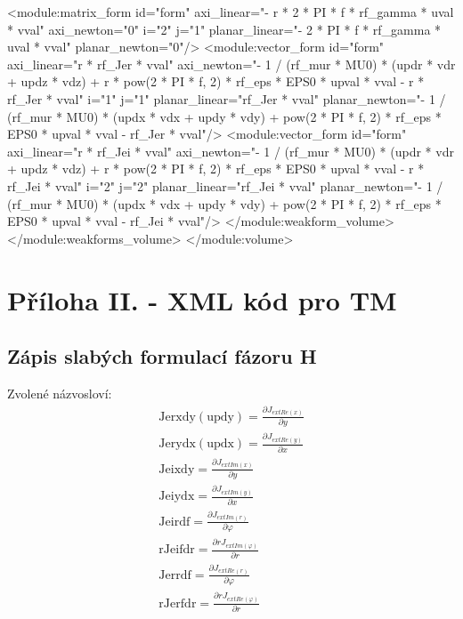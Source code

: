 \documentclass[12pt,a4paper,oneside]{article}
\numberwithin{equation}{section} %
\numberwithin{figure}{section} %
\numberwithin{table}{section} %
\begin{document}
\begin{spverbatim}
        <module:matrix_form id="form" axi_linear="- r * 2 * PI * f * rf_gamma * uval * vval" axi_newton="0" i="2" j="1" planar_linear="- 2 * PI * f * rf_gamma * uval * vval" planar_newton="0"/>
        <module:vector_form id="form" axi_linear="r * rf_Jer * vval" axi_newton="- 1 / (rf_mur * MU0) * (updr * vdr + updz * vdz) + r * pow(2 * PI * f, 2) * rf_eps * EPS0 * upval * vval - r * rf_Jer * vval" i="1" j="1" planar_linear="rf_Jer * vval" planar_newton="- 1 / (rf_mur * MU0) * (updx * vdx + updy * vdy) + pow(2 * PI * f, 2) * rf_eps * EPS0 * upval * vval - rf_Jer * vval"/>
        <module:vector_form id="form" axi_linear="r * rf_Jei * vval" axi_newton="- 1 / (rf_mur * MU0) * (updr * vdr + updz * vdz) + r * pow(2 * PI * f, 2) * rf_eps * EPS0 * upval * vval - r * rf_Jei * vval" i="2" j="2" planar_linear="rf_Jei * vval" planar_newton="- 1 / (rf_mur * MU0) * (updx * vdx + updy * vdy) + pow(2 * PI * f, 2) * rf_eps * EPS0 * upval * vval - rf_Jei * vval"/>
     </module:weakform_volume>
    </module:weakforms_volume>
  </module:volume>
\end{spverbatim}

\newpage
\section*{Příloha II. - XML kód pro TM}
\subsection*{Zápis slabých formulací fázoru H}
\label{xmlH}
Zvolené názvosloví:
\begin{align*}
\mathrm{Jerxdy (updy)} = \frac{\partial J _{extRe(x)}}{\partial y}
\\
\mathrm{Jerydx (updx)} = \frac{\partial J _{extRe(y)}}{\partial x}
\\
\mathrm{Jeixdy} = \frac{\partial J _{extIm(x)}}{\partial y}
\\
\mathrm{Jeiydx} = \frac{\partial J _{extIm(y)}}{\partial x}
\\
\mathrm{Jeirdf} = \frac{\partial J _{extIm(r)}}{\partial \varphi}
\\
\mathrm{rJeifdr} = \frac{\partial r J _{extIm(\varphi)}}{\partial r}
\\
\mathrm{Jerrdf} = \frac{\partial J _{extRe(r)}}{\partial \varphi}
\\
\mathrm{rJerfdr} = \frac{\partial r J _{extRe(\varphi)}}{\partial r}
\\
\end{align*}
\end{document}
